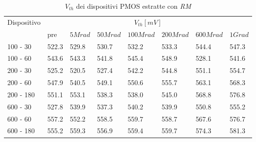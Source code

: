 \documentclass[12pt, letterpaper]{book}
\begin{document}
\begin{table}[H]
  \renewcommand{\arraystretch}{1.3}
  \begin{tabular}{m{2cm} m{0.8cm} m{1.1cm} m{1.3cm} m{1.5cm} m{1.5cm} m{1.5cm} m{1cm}}
    \toprule
    \multirow{2}{*}{Dispositivo} & \multicolumn{7}{c}{$V_{th} [mV] $}                                                                    \\
    \cmidrule{2-8}
                                 & pre                                & $5Mrad$ & $50Mrad$ & $100Mrad$ & $200Mrad$ & $600Mrad$ & $1Grad$ \\
    \midrule
    100 - 30                     & 522.3                              & 529.8   & 530.7    & 532.2     & 533.3     & 544.4     & 547.3   \\
    \hline
    100 - 60                     & 543.6                              & 543.3   & 541.8    & 545.4     & 548.9     & 528.1     & 541.6   \\
    \hline
    200 - 30                     & 525.2                              & 520.5   & 527.4    & 542.2     & 544.8     & 551.1     & 554.7   \\
    \hline
    200 - 60                     & 547.9                              & 540.5   & 549.1    & 550.6     & 555.7     & 563.1     & 568.3   \\
    \hline
    200 - 180                    & 551.1                              & 553.1   & 538.3    & 538.0     & 545.0     & 568.8     & 576.8   \\
    \hline
    600 - 30                     & 527.8                              & 539.9   & 537.3    & 540.2     & 539.9     & 550.8     & 555.2   \\
    \hline
    600 - 60                     & 557.2                              & 552.2   & 558.5    & 559.7     & 558.7     & 567.6     & 576.7   \\
    \hline
    600 - 180                    & 555.2                              & 559.3   & 556.9    & 559.4     & 559.7     & 574.3     & 581.3   \\
    \bottomrule
  \end{tabular}
  \caption{$V_{th}$ dei dispositivi PMOS estratte con \emph{RM}}
  \label{tab:VthRMP}
\end{table}
\end{document}
